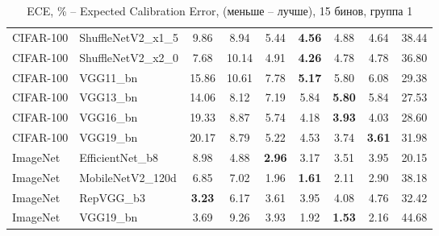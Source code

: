 \begin{table}[h!]
{\begin{tabular}{llccccccc}
CIFAR-100 & ShuffleNetV2\_x1\_5 &                  9.86 &                  8.94 &                  5.44 & \textbf{4.56} &                  4.88 &                  4.64 &       38.44 \\
CIFAR-100 & ShuffleNetV2\_x2\_0 &                  7.68 &                 10.14 &                  4.91 & \textbf{4.26} &                  4.78 &                  4.78 &       36.80 \\
CIFAR-100 &          VGG11\_bn &                 15.86 &                 10.61 &                  7.78 & \textbf{5.17} &                  5.80 &                  6.08 &       29.38 \\
CIFAR-100 &          VGG13\_bn &                 14.06 &                  8.12 &                  7.19 &                  5.84 & \textbf{5.80} &                  5.84 &       27.53 \\
CIFAR-100 &          VGG16\_bn &                 19.33 &                  8.87 &                  5.74 &                  4.18 & \textbf{3.93} &                  4.03 &       28.60 \\
CIFAR-100 &          VGG19\_bn &                 20.17 &                  8.79 &                  5.22 &                  4.53 &                  3.74 & \textbf{3.61} &       31.98 \\
 ImageNet &   EfficientNet\_b8 &                  8.98 &                  4.88 & \textbf{2.96} &                  3.17 &                  3.51 &                  3.95 &       20.15 \\
 ImageNet &  MobileNetV2\_120d &                  6.85 &                  7.02 &                  1.96 & \textbf{1.61} &                  2.11 &                  2.90 &       38.18 \\
 ImageNet &         RepVGG\_b3 & \textbf{3.23} &                  6.17 &                  3.61 &                  3.95 &                  4.08 &                  4.76 &       32.42 \\
 ImageNet &          VGG19\_bn &                  3.69 &                  9.26 &                  3.93 &                  1.92 & \textbf{1.53} &                  2.16 &       44.68 \\
\bottomrule
\end{tabular}%
}
\caption{ECE, \% -- Expected Calibration Error, (меньше -- лучше), 15 бинов, группа 1}
\label{tab:metrics:ECE_1}
\end{table}
